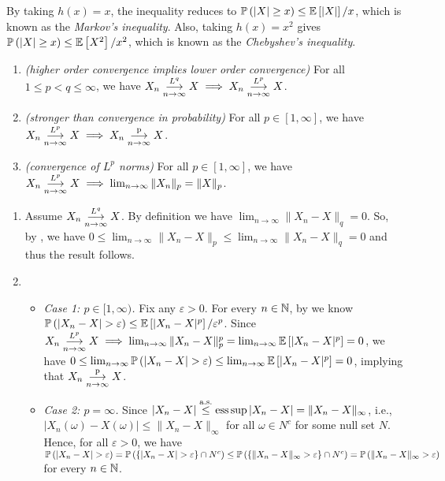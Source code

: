 \begin{enumerate}
\begin{note}
By taking \(h(x)=x\), the inequality reduces to \(\mathbb{P}\left(|X|\ge
x\right)\le\mathbb{E}\left[|X|\right]/x\), which is known as the \emph{Markov's inequality}. Also,
taking \(h(x)=x^2\) gives \(\mathbb{P}\left(|X|\ge x\right)\le\mathbb{E}\left[X^2\right]/x^2\), which is known
as the \emph{Chebyshev's inequality}.
\end{note}
\begin{proposition}
\label{prp:conv-lp-prop}
\hfill
\begin{enumerate}
\item \emph{(higher order convergence implies lower order convergence)} For all \(1\le
p<q\le \infty\), we have \(X_n\underset{n\to\infty}{\overset{L^q}{\longrightarrow}}X\implies X_n\underset{n\to\infty}{\overset{L^p}{\longrightarrow}} X\).
\item \emph{(stronger than convergence in probability)} For all \(p\in
[1,\infty]\), we have \(X_n\underset{n\to\infty}{\overset{L^p}{\longrightarrow}} X\implies X_n\underset{n\to\infty}{\overset{\text{p}}{\longrightarrow}} X\).
\item \emph{(convergence of \(L^p\) norms)} For all \(p\in [1,\infty]\), we
have \(X_n\underset{n\to\infty}{\overset{L^p}{\longrightarrow}} X\implies \lim_{n\to\infty}\|X_n\|_{p}=\|X\|_{p}\).
\end{enumerate}
\end{proposition}
\begin{pf}
\begin{enumerate}
\item Assume \(X_n\underset{n\to\infty}{\overset{L^q}{\longrightarrow}}X\). By definition we have
\(\lim_{n\to\infty}\|X_n-X\|_{q}=0\). So, by ,
we have \(0\le
\lim_{n\to\infty}\|X_n-X\|_{p}\le\lim_{n\to\infty}\|X_n-X\|_{q}=0\) and thus
the result follows.
\item
\begin{itemize}
\item \emph{Case 1: \(p\in [1,\infty)\).} Fix any \(\varepsilon>0\). For every
\(n\in\mathbb{N}\), by  we know
\(\prob{|X_n-X|>\varepsilon}\le\expv{|X_n-X|^{p}}/\varepsilon^{p}\). Since
\(X_n\underset{n\to\infty}{\overset{L^p}{\longrightarrow}} X\implies
\lim_{n\to\infty}\|X_n-X\|_{p}^p=\lim_{n\to\infty}\mathbb{E}\left[|X_n-X|^{p}\right]=0\), we have
\(0\le\lim_{n\to\infty}\prob{|X_n-X|>\varepsilon}\le\lim_{n\to\infty}\expv{|X_n-X|^{p}}=0
\), implying that \(X_n\underset{n\to\infty}{\overset{\text{p}}{\longrightarrow}} X\).
\item \emph{Case 2: \(p=\infty\).} Since
\(|X_n-X|\overset{\text{a.s.}}{\le}\operatorname*{ess\,sup}|X_n-X|=\|X_n-X\|_{\infty}\), i.e.,
\(|X_n(\omega)-X(\omega)|\le\|X_n-X\|_{\infty}\) for all \(\omega\in N^c\) for
some null set \(N\).  Hence, for all \(\varepsilon>0\), we have
\(\prob{|X_n-X|>\varepsilon}=
\prob{\{|X_n-X| >\varepsilon\}\cap N^c}
\le\prob{\{\|X_n-X\|_{\infty}>\varepsilon\}\cap N^c}
=\prob{\|X_n-X\|_{\infty}>\varepsilon}\)
for every \(n\in\mathbb{N}\).


\end{itemize}
\end{enumerate}
\end{pf}
\end{enumerate}
